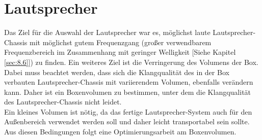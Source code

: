 \section{Lautsprecher}\label{subsec:2.1.2}
Das Ziel für die Auswahl der Lautsprecher war es, möglichst laute Lautsprecher-Chassis mit möglichst gutem Frequenzgang (großer verwendbarem Frequenzbereich im Zusammenhang mit geringer Welligkeit [Siehe Kapitel \ref{sec:8.6}]) zu finden.
Ein weiteres Ziel ist die Verringerung des Volumens der Box.
Dabei muss beachtet werden, dass sich die Klangqualität des in der Box verbauten Lautsprecher-Chassis mit variierendem Volumen, ebenfalls verändern kann.
Daher ist ein Boxenvolumen zu bestimmen, unter dem die Klangqualität des Lautsprecher-Chassis nicht leidet.\\
Ein kleines Volumen ist nötig, da das fertige Lautsprecher-System auch für den Außenbereich verwendet werden soll und daher leicht transportabel sein sollte.
Aus diesen Bedingungen folgt eine Optimierungsarbeit am Boxenvolumen.